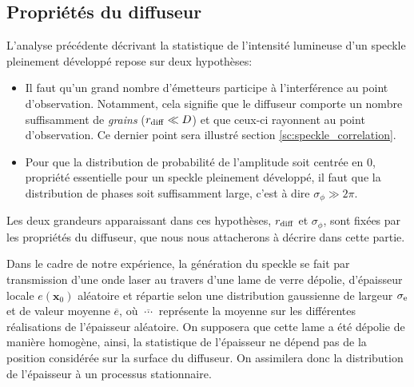 \subsection{Propriétés du diffuseur}
\label{sec:propriete_diffuseur}
L'analyse précédente décrivant la statistique de l'intensité lumineuse d'un speckle pleinement développé repose sur deux hypothèses: 
\begin{itemize}
\item[\textendash] Il faut qu'un grand nombre d'émetteurs participe à l'interférence au point d'observation. Notamment, cela signifie que le diffuseur comporte un nombre suffisamment de \emph{grains} ($r_{\mathrm{diff}} \ll D$)  et que ceux-ci rayonnent au point d'observation. Ce dernier point sera illustré section \ref{sc:speckle_correlation}.
\item[\textendash] Pour que la distribution de probabilité de l'amplitude soit centrée en 0, propriété essentielle pour un speckle pleinement développé, il faut que la distribution de phases soit suffisamment large, c'est à dire $\sigma_\phi \gg 2\pi$. 
\end{itemize}
Les deux grandeurs apparaissant dans ces hypothèses, $r_{\mathrm{diff}}$ et $\sigma_\phi$, sont fixées par les propriétés du diffuseur, que nous nous attacherons à décrire dans cette partie.

Dans le cadre de notre expérience, la génération du speckle se fait par transmission d'une onde laser au travers d'une lame de verre dépolie, d'épaisseur locale $e(\mathbf{x}_0)$ aléatoire et répartie selon une distribution gaussienne de largeur $\sigma_{\mathrm{e}}$ et de valeur moyenne $\overline{e}$, où $\overline{\:\cdots\:}$ représente la moyenne sur les différentes réalisations de l'épaisseur aléatoire. On supposera que cette lame a été dépolie de manière homogène, ainsi, la statistique de l'épaisseur ne dépend pas de la position considérée sur la surface du diffuseur. On assimilera donc la distribution de l'épaisseur à un processus stationnaire. 

